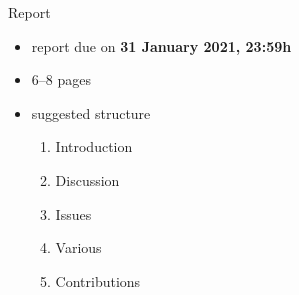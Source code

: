   \begin{frame}{Report}
    \begin{itemize}
      \item report due on \textbf{31 January 2021, 23:59h}
      \item 6--8 pages
      \item suggested structure
      \begin{enumerate}
        \item Introduction
        \item Discussion
        \item Issues
        \item Various
        \item Contributions
      \end{enumerate}
    \end{itemize}
  \end{frame}